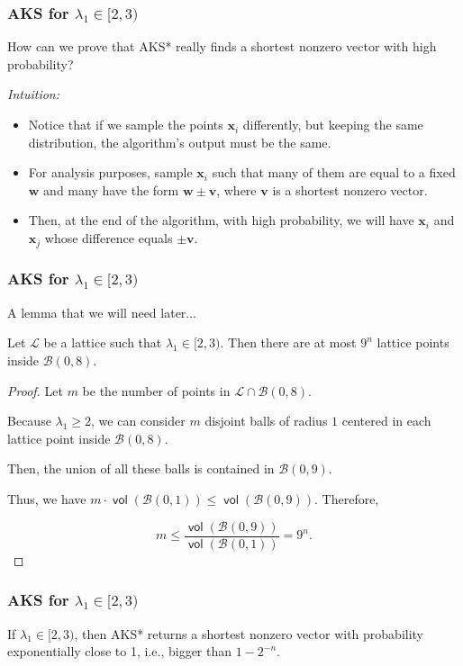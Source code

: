 \documentclass[aspectratio=43]{beamer}
\newcommand{\ball}[1]{\mathcal{B}(0, #1)}
\DeclareMathOperator{\vol}{\textsf{vol}}
\let\vec\mathbf %
\theoremstyle{remark}
\begin{document}
\begin{frame}
\frametitle{AKS for $\lambda_1 \in [2, 3)$}

How can we prove that {\sc AKS*} really finds a shortest nonzero vector with 
high probability?

\vspace*{0.5cm}

\emph{Intuition:}

\begin{itemize}
\item Notice that if we sample the points $\vec{x}_i$ differently, but keeping 
the same distribution, the algorithm's output must be the same.

\item For analysis purposes, sample $\vec{x}_i$ such that many of them are 
equal to a fixed $\vec{w}$ and many have the form $\vec{w} \pm \vec{v}$, where  
$\vec{v}$ is a shortest nonzero vector.

\item Then, at the end of the algorithm, with high probability, we will have 
$\vec{x}_i$ and $\vec{x}_j$ whose difference equals $\pm\vec{v}$.

\end{itemize}
\end{frame}


\begin{frame}
\frametitle{AKS for $\lambda_1 \in [2, 3)$}

A lemma that we will need later...

\begin{lemma}
Let $\mathcal{L}$ be a lattice such that $\lambda_1 \in [2, 3)$. Then there are 
at most $9^{n}$ lattice points inside $\ball{8}$.
\end{lemma}

\pause

\begin{proof}
Let $m$ be the number of points in $\mathcal{L} \cap \ball{8}$.

Because $\lambda_1 \ge 2$, we can consider $m$ disjoint balls of radius $1$ 
centered in 
each lattice point inside $\ball{8}$.

Then, the union of all these balls is contained in $\ball{9}$.

Thus, we have $m \cdot \vol(\ball{1}) \le \vol(\ball{9})$. Therefore,

$$m \le \frac{\vol(\ball{9})}{\vol(\ball{1})} = 9^n.$$


\end{proof}

\end{frame}
\begin{frame}
\frametitle{AKS for $\lambda_1 \in [2, 3)$}

\begin{theorem}
If $\lambda_1 \in [2, 3)$, then {\sc AKS*} returns a shortest nonzero vector 
with probability exponentially close to 1, i.e., bigger than $1 - 2^{-n}$. 
\end{theorem}
\end{frame}
\end{document}
